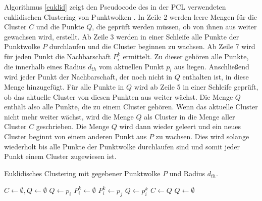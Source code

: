 Algorithmus \ref{euklid} zeigt den Pseudocode des in der PCL verwendeten euklidischen Clustering von Punktwolken \cite{Rusu2009}. In Zeile 2 werden leere Mengen für die Cluster $ C $ und die Punkte $ Q $, die geprüft werden müssen, ob von ihnen aus weiter gewachsen wird, erstellt. Ab Zeile 3 werden in einer Schleife alle Punkte der Punktwolke $ P $ durchlaufen und die Cluster beginnen zu wachsen. Ab Zeile 7 wird für jeden Punkt die Nachbarschaft $ P_i^k $ ermittelt. Zu dieser gehören alle Punkte, die innerhalb eines Radius $ d_{th} $ vom aktuellen Punkt $ p_i $ aus liegen. Anschließend wird jeder Punkt der Nachbarschaft, der noch nicht in $ Q $ enthalten ist, in diese Menge hinzugefügt. Für alle Punkte in $ Q $ wird ab Zeile 5 in einer Schleife geprüft, ob das aktuelle Cluster von diesen Punkten aus weiter wächst. Die Menge $ Q $ enthält also alle Punkte, die zu einem Cluster gehören. Wenn das aktuelle Cluster nicht mehr weiter wächst, wird die Menge $ Q $ als Cluster in die Menge aller Cluster $ C $ geschrieben. Die Menge $ Q $ wird dann wieder geleert und ein neues Cluster beginnt von einem anderen Punkt aus $ P $  zu wachsen. Dies wird solange wiederholt bis alle Punkte der Punktwolke durchlaufen sind und somit jeder Punkt einem Cluster zugewiesen ist. 
%
\begin{algorithm}
	\caption{Euklidisches Clustering mit gegebener Punktwolke $ P $ und Radius $ d_{th} $.}
	\label{euklid}
	\begin{algorithmic}[1]
			\State $ C \leftarrow \emptyset, Q \leftarrow \emptyset $
				\State $ Q \leftarrow p_i $
					\State $ P_i^k \leftarrow \emptyset $
							\State $ P_i^k \leftarrow p_j $
						\EndIf
					\EndFor
							\State $ Q \leftarrow p_i^k $
						\EndIf
					\EndFor
				\EndFor
				\State $ C \leftarrow Q $
				\State $ Q \leftarrow \emptyset $
			\EndFor
			\State {}
		\EndFunction
	\end{algorithmic}
\end{algorithm}

